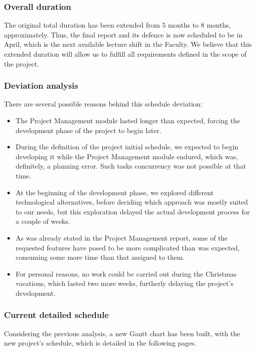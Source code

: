 \subsubsection{Overall duration}

The original total duration has been extended from 5 months to 8 months, approximately. Thus, the final report and its defence is now scheduled to be in April, which is the next available lecture shift in the Faculty. We believe that this extended duration will allow us to fulfill all requirements defined in the scope of the project.

\subsubsection{Deviation analysis}

There are several possible reasons behind this schedule deviation:

\begin{itemize}
	\item The Project Management module lasted longer than expected, forcing the development phase of the project to begin later.
	\item During the definition of the project initial schedule, we expected to begin developing it while the Project Management module endured, which was, definitely, a planning error. Such tasks concurrency was not possible at that time.
	\item At the beginning of the development phase, we explored different technological alternatives, before deciding which approach was mostly suited to our needs, but this exploration delayed the actual development process for a couple of weeks.
	\item As was already stated in the Project Management report, some of the requested features have posed to be more complicated than was expected, consuming some more time than that assigned to them.
	\item For personal reasons, no work could be carried out during the Christmas vacations, which lasted two more weeks, furtherly delaying the project's development.
\end{itemize}

\subsubsection{Current detailed schedule}

Considering the previous analysis, a new Gantt chart has been built, with the new project's schedule, which is detailed in the following pages.


